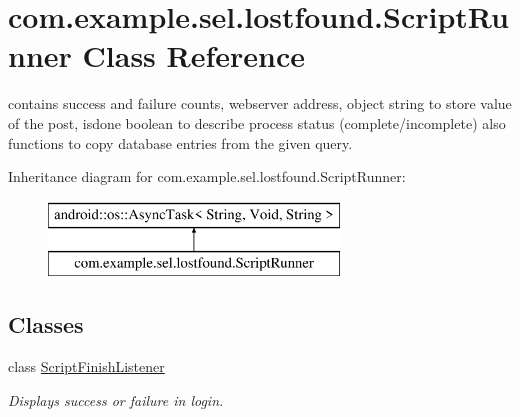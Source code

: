 \hypertarget{classcom_1_1example_1_1sel_1_1lostfound_1_1ScriptRunner}{}\section{com.\+example.\+sel.\+lostfound.\+Script\+Runner Class Reference}
\label{classcom_1_1example_1_1sel_1_1lostfound_1_1ScriptRunner}


contains success and failure counts, webserver address, object string to store value of the post, isdone boolean to describe process status (complete/incomplete) also functions to copy database entries from the given query.  


Inheritance diagram for com.\+example.\+sel.\+lostfound.\+Script\+Runner\+:\begin{figure}[H]
\begin{center}
\leavevmode
\includegraphics[height=2.000000cm]{classcom_1_1example_1_1sel_1_1lostfound_1_1ScriptRunner}
\end{center}
\end{figure}
\subsection*{Classes}
\begin{DoxyCompactItemize}
\item 
class \hyperlink{interfacecom_1_1example_1_1sel_1_1lostfound_1_1ScriptRunner_1_1ScriptFinishListener}{Script\+Finish\+Listener}
\begin{DoxyCompactList}\small\item\em Displays success or failure in login. \end{DoxyCompactList}\end{DoxyCompactItemize}
